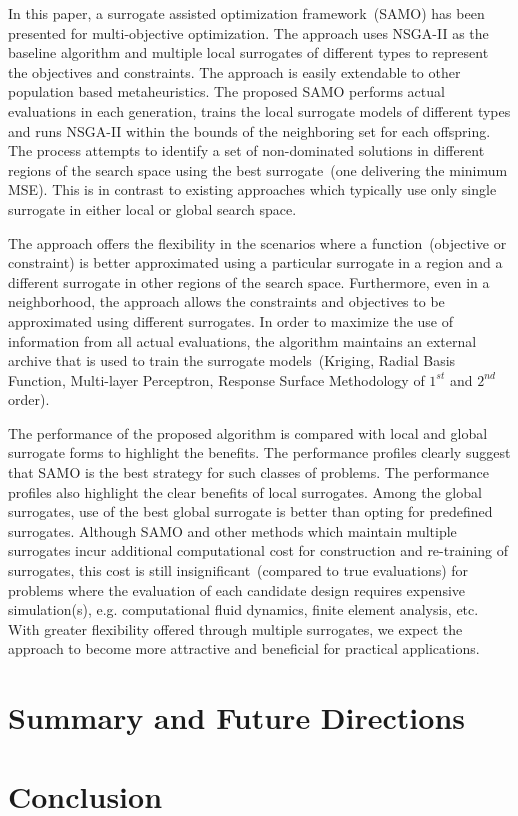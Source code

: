 In this paper, a surrogate assisted optimization framework~(SAMO) has been presented for multi-objective optimization. The approach uses NSGA-II as the baseline algorithm and multiple local surrogates of different types to represent the objectives and constraints. The approach is easily extendable to other population based metaheuristics. The proposed SAMO performs actual evaluations in each generation, trains the local surrogate models of different types and runs NSGA-II within the bounds of the neighboring set for each offspring. The process attempts to identify a set of non-dominated solutions in different regions of the search space using the best surrogate~(one delivering the minimum MSE). This is in contrast to existing approaches which typically use only single surrogate in either local or global search space.

The approach offers the flexibility in the scenarios where a function~(objective or constraint) is better approximated using a particular surrogate in a region and a different surrogate in other regions of the search space. Furthermore, even in a neighborhood, the approach allows the constraints and objectives to be approximated using different surrogates. In order to maximize the use of information from all actual evaluations, the algorithm maintains an external archive that is used to train the surrogate models~(Kriging, Radial Basis Function, Multi-layer Perceptron, Response Surface Methodology of $1^{st}$ and $2^{nd}$ order). 

The performance of the proposed algorithm is compared with local and global surrogate forms to highlight the benefits. The performance profiles clearly suggest that SAMO is the best strategy for such classes of problems. The performance profiles also highlight the clear benefits of local surrogates. Among the global surrogates, use of the best global surrogate is better than opting for predefined surrogates. Although SAMO and other methods which maintain multiple surrogates incur additional computational cost for construction and re-training of surrogates, this cost is still insignificant~(compared to true evaluations) for problems where the evaluation of each candidate design requires expensive simulation(s), e.g. computational fluid dynamics, finite element analysis, etc. With greater flexibility offered through multiple surrogates, we expect the approach to become more attractive and beneficial for practical applications. 

\section{Summary and Future Directions}
\label{sec:sum}


\section{Conclusion}
\label{sec:conc}


\small
